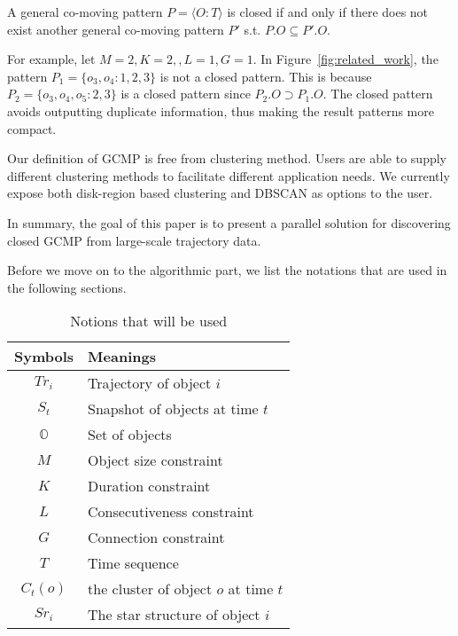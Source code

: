 \begin{definition}
A general co-moving pattern $P=\langle O:T \rangle$ is closed if and only if there does not exist another general co-moving pattern $P'$ s.t. $P.O \subseteq P'.O$.
\end{definition}

For example, let $M=2,K=2,,L=1,G=1$. In Figure~\ref{fig:related_work},
the pattern $P_1 = \{o_3,o_4:1,2,3\}$ is not a closed pattern. This is because $P_2=\{o_3,o_4,o_5:2,3\}$ is a closed pattern since $P_2.O \supset P_1.O$. The closed pattern avoids outputting duplicate information, thus making the result patterns more compact. 

Our definition of GCMP is free from clustering method. Users are able to supply different clustering methods to facilitate different application needs. 
We currently expose both disk-region based clustering and DBSCAN as options to the user.

In summary, the goal of this paper is to present a parallel solution for discovering closed GCMP from large-scale trajectory data.

Before we move on to the algorithmic part, we list the notations that are used in the following sections.

\begin{table}[h]
\centering
\begin{tabular}{|c|l|} 
\hline
Symbols & Meanings \\
\hline 
$Tr_i$ & Trajectory of object $i$\\ 
\hline
$S_t$ & Snapshot of objects at time $t$ \\
\hline 
$\mathbb{O}$ & Set of objects \\ 
\hline
$M$ & Object size constraint \\
\hline 
$K$ & Duration constraint\\
\hline
$L$ & Consecutiveness constraint\\
\hline
$G$ & Connection constraint \\
\hline
$T$ & Time sequence \\
\hline
$C_t(o)$ & the cluster of object $o$ at time $t$ \\
\hline 
$Sr_i $ &  The star structure of object $i$ \\
\hline 
\end{tabular} 
\caption{Notions that will be used}
\end{table}